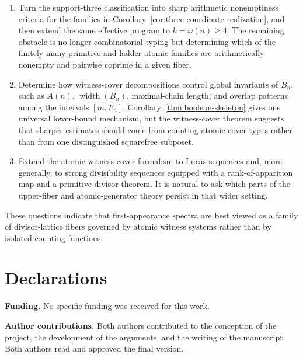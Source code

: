 \documentclass[11pt,letterpaper]{article}
\numberwithin{equation}{section}
\theoremstyle{plain}
\theoremstyle{definition}
\theoremstyle{remark}
\DeclareMathOperator{\widthop}{width}
\begin{document}
\begin{enumerate}[label=(\arabic*)]
\item Turn the support-three classification into sharp arithmetic nonemptiness
criteria for the families in Corollary~\ref{cor:three-coordinate-realization},
and then extend the same effective program to $k=\omega(n)\ge 4$. The
remaining obstacle is no longer combinatorial typing but determining which of
the finitely many primitive and ladder atomic families are arithmetically
nonempty and pairwise coprime in a given fiber.
\item Determine how witness-cover decompositions control global invariants of
$B_n$, such as $A(n)$, $\widthop(B_n)$, maximal-chain length, and overlap
patterns among the intervals $[m,F_n]$. Corollary~\ref{thm:boolean-skeleton}
gives one universal lower-bound mechanism, but the witness-cover theorem
suggests that sharper estimates should come from counting atomic cover types
rather than from one distinguished squarefree subposet.
\item Extend the atomic witness-cover formalism to Lucas sequences and, more
generally, to strong divisibility sequences equipped with a rank-of-apparition
map and a primitive-divisor theorem. It is natural to ask which parts of the
upper-fiber and atomic-generator theory persist in that wider setting.
\end{enumerate}

These questions indicate that first-appearance spectra are best viewed as a
family of divisor-lattice fibers governed by atomic witness systems rather than
by isolated counting functions.

\section*{Declarations}


\noindent\textbf{Funding.} No specific funding was received for this work.

\smallskip

\noindent\textbf{Author contributions.} Both authors contributed to the
conception of the project, the development of the arguments, and the writing
of the manuscript. Both authors read and approved the final version.

\smallskip
\end{document}
